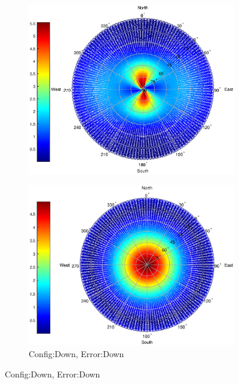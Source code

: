 \begin{figure}
\begin{subfigure}{0.49\textwidth}
\includegraphics[width =\linewidth]{ChapterExperiments/Figures/plane_Edown_north_pow4}
\end{subfigure}
\begin{subfigure}{0.49\linewidth}
\centering
\caption{Config:Down, Error:Down}
\includegraphics[width = \linewidth]{ChapterExperiments/Figures/plane_Edown_down_pow4}
\end{subfigure}
\end{figure}
